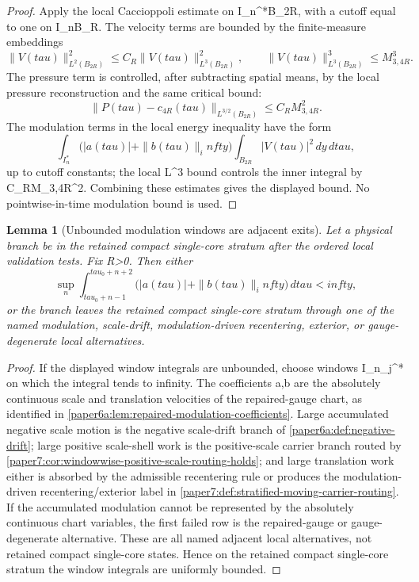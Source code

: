 \documentclass[11pt]{amsart}
\def\({}%
\def\){}%
\def\tau{tau}%
\def\infty{infty}%
\theoremstyle{plain}
\newtheorem{lemma}[lemma]{Lemma}
\theoremstyle{definition}
\theoremstyle{remark}
\begin{document}
\begin{proof}
Apply the local Caccioppoli estimate on \(I_n^*\times B_{2R}\), with a cutoff
equal to one on \(I_n\times B_R\).  The velocity terms are bounded by the
finite-measure embeddings
\[
  \|V(\tau)\|_{L^2(B_{2R})}^2\le C_R\|V(\tau)\|_{L^3(B_{2R})}^2,
  \qquad
  \|V(\tau)\|_{L^3(B_{2R})}^3\le M_{3,4R}^3 .
\]
The pressure term is controlled, after subtracting spatial means, by the local
pressure reconstruction and the same critical bound:
\[
  \|P(\tau)-c_{4R}(\tau)\|_{L^{3/2}(B_{2R})}
  \le C_RM_{3,4R}^2 .
\]
The modulation terms in the local energy inequality have the form
\[
  \int_{I_n^*}\bigl(|a(\tau)|+\|b(\tau)\|_\infty\bigr)
  \int_{B_{2R}}|V(\tau)|^2\,dy\,d\tau,
\]
up to cutoff constants; the local \(L^3\) bound controls the inner integral by
\(C_RM_{3,4R}^2\).  Combining these estimates gives the displayed bound.  No
pointwise-in-time modulation bound is used.
\end{proof}

\begin{lemma}[Unbounded modulation windows are adjacent exits]
\label{paper6a:lem:modulation-window-bound-or-exit}
Let a physical branch be in the retained compact single-core stratum after the
ordered local validation tests.  Fix \(R>0\).  Then either
\[
  \sup_n
  \int_{\tau_0+n-1}^{\tau_0+n+2}
  \bigl(|a(\tau)|+\|b(\tau)\|_\infty\bigr)\,d\tau<\infty,
\]
or the branch leaves the retained compact single-core stratum through one of
the named modulation, scale-drift, modulation-driven recentering, exterior, or
gauge-degenerate local alternatives.
\end{lemma}

\begin{proof}
If the displayed window integrals are unbounded, choose windows \(I_{n_j}^*\)
on which the integral tends to infinity.  The coefficients \(a,b\) are the
absolutely continuous scale and translation velocities of the repaired-gauge
chart, as identified in
\cref{paper6a:lem:repaired-modulation-coefficients}.  Large accumulated
negative scale motion is the negative scale-drift branch of
\cref{paper6a:def:negative-drift}; large positive scale-shell work is the
positive-scale carrier branch routed by
\cref{paper7:cor:windowwise-positive-scale-routing-holds}; and large
translation work either is absorbed by the admissible recentering rule or
produces the modulation-driven recentering/exterior label in
\cref{paper7:def:stratified-moving-carrier-routing}.  If the accumulated
modulation cannot be represented by the absolutely continuous chart variables,
the first failed row is the repaired-gauge or gauge-degenerate alternative.
These are all named adjacent local alternatives, not retained compact
single-core states.  Hence on the retained compact single-core stratum the
window integrals are uniformly bounded.
\end{proof}
\end{document}
